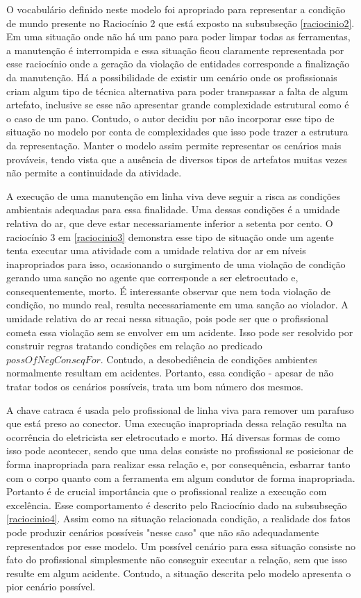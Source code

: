 O vocabulário definido neste modelo foi apropriado para representar a condição de mundo presente no Raciocínio 2 que está exposto na subsubseção \ref{raciocinio2}. Em uma situação onde não há um pano para poder limpar todas as ferramentas, a manutenção é interrompida e essa situação ficou claramente representada por esse raciocínio onde a geração da violação de entidades corresponde a finalização da manutenção. Há a possibilidade de existir um cenário onde os profissionais criam algum tipo de técnica alternativa para poder transpassar a falta de algum artefato, inclusive se esse não apresentar grande complexidade estrutural como é o caso de um pano. Contudo, o autor decidiu por não incorporar esse tipo de situação no modelo por conta de complexidades que isso pode trazer a estrutura da representação. Manter o modelo assim permite representar os cenários mais prováveis, tendo vista que a ausência de diversos tipos de artefatos muitas vezes não permite a continuidade da atividade.    

A execução de uma manutenção em linha viva deve seguir a risca as condições ambientais adequadas para essa finalidade. Uma dessas condições é a umidade relativa do ar, que deve estar necessariamente inferior a setenta por cento. O raciocínio 3 em \ref{raciocinio3} demonstra esse tipo de situação onde um agente tenta executar uma atividade com a umidade relativa dor ar em níveis inapropriados para isso, ocasionando o surgimento de uma violação de condição gerando uma sanção no agente que corresponde a ser eletrocutado e, consequentemente, morto. É interessante observar que nem toda violação de condição, no mundo real, resulta necessariamente em uma sanção ao violador. A umidade relativa do ar recai nessa situação, pois pode ser que o profissional cometa essa violação sem se envolver em um acidente. Isso pode ser resolvido por construir regras tratando condições em relação ao predicado $possOfNegConseqFor$. Contudo, a desobediência de condições ambientes normalmente resultam em acidentes. Portanto, essa condição - apesar de não tratar todos os cenários possíveis, trata um bom número dos mesmos.

A chave catraca é usada pelo profissional de linha viva para remover um parafuso que está preso ao conector. Uma execução inapropriada dessa relação resulta na ocorrência do eletricista ser eletrocutado e morto. Há diversas formas de como isso pode acontecer, sendo que uma delas consiste no profissional se posicionar de forma inapropriada para realizar essa relação e, por consequência, esbarrar tanto com o corpo quanto com a ferramenta em algum condutor de forma inapropriada. Portanto é de crucial importância que o profissional realize a execução com excelência. Esse comportamento é descrito pelo Raciocínio dado na subsubseção \ref{raciocinio4}. Assim como na situação relacionada condição, a realidade dos fatos pode produzir cenários possíveis "nesse caso" que não são adequadamente representados por esse modelo. Um possível cenário para essa situação consiste no fato do profissional simplesmente não conseguir executar a relação, sem que isso resulte em algum acidente. Contudo, a situação descrita pelo modelo apresenta o pior cenário possível. 

